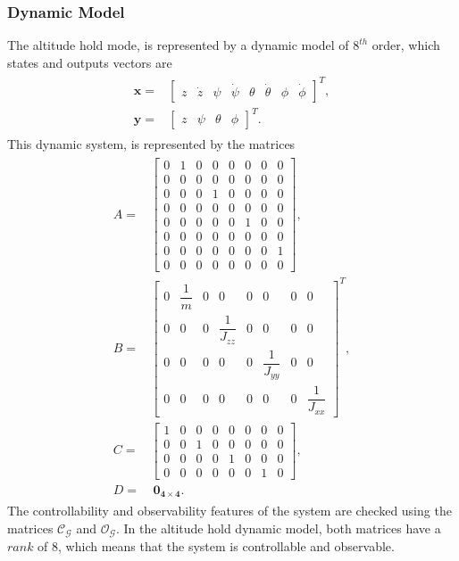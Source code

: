\subsubsection{Dynamic Model}
The altitude hold mode, is represented by a dynamic model of $8^{th}$ order, which states and outputs vectors are
\begin{align}
\begin{split}
\mathbf{x} = & \begin{bmatrix}
z & \dot{z} & \psi & \dot{\psi} & \theta & \dot{\theta} & \phi & \dot{\phi}
\end{bmatrix}^{T},\\[15px]
\mathbf{y} = & \begin{bmatrix}
z & \psi & \theta & \phi
\end{bmatrix}^{T}.
\end{split}
\end{align}
This dynamic system, is represented by the matrices
\begin{align}
\begin{split}
A = & 
\begin{bmatrix}
0 & 1 & 0 & 0 & 0 & 0 & 0 & 0\\[2px]
0 & 0 & 0 & 0 & 0 & 0 & 0 & 0\\[2px]
0 & 0 & 0 & 1 & 0 & 0 & 0 & 0\\[2px]
0 & 0 & 0 & 0 & 0 & 0 & 0 & 0\\[2px]
0 & 0 & 0 & 0 & 0 & 1 & 0 & 0\\[2px]
0 & 0 & 0 & 0 & 0 & 0 & 0 & 0\\[2px]
0 & 0 & 0 & 0 & 0 & 0 & 0 & 1\\[2px]
0 & 0 & 0 & 0 & 0 & 0 & 0 & 0
\end{bmatrix}, \\[5px]
B = & 
\begin{bmatrix}
0 & \dfrac{1}{m} & 0 & 0 & 0 & 0 & 0 & 0\\[5px]
0 & 0 & 0 & \dfrac{1}{J_{zz}} & 0 & 0 & 0 & 0\\[5px]
0 & 0 & 0 & 0 & 0 & \dfrac{1}{J_{yy}} & 0 & 0\\[5px]
0 & 0 & 0 & 0 & 0 & 0 & 0 & \dfrac{1}{J_{xx}}
\end{bmatrix}^{T}, \\[5px]
C = & 
\begin{bmatrix}
1 & 0 & 0 & 0 & 0 & 0 & 0 & 0 \\[2px]
0 & 0 & 1 & 0 & 0 & 0 & 0 & 0 \\[2px]
0 & 0 & 0 & 0 & 1 & 0 & 0 & 0 \\[2px]
0 & 0 & 0 & 0 & 0 & 0 & 1 & 0 
\end{bmatrix}, \\[5px]
D = &\ \mathbf{0_{4\times 4}}.
\end{split}
\end{align}
The controllability and observability features of the system are checked using the matrices $\mathcal{C_G}$ and $\mathcal{O_G}$. In the altitude hold dynamic model, both matrices have a $rank$ of $8$, which means that the system is controllable and observable.
\\\\
